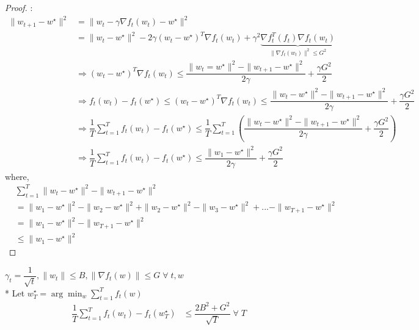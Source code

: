 \documentclass{article}
\begin{document}
\begin{proof} \label{proof:t1} 
:
\begin{align*}
\| w_{t+1} - w^\star  \|^{2} &= \| w_{t} - \gamma \nabla  f_{t}\left(w_{t}\right) - w^\star  \|^{2}
\\ &= \| w_{t} - w^\star  \|^{2} - 2 \gamma \left(w_{t} - w^\star \right)^{T} \nabla  f_{t}\left(w_{t}\right) + \gamma^{2} \underbrace{ \nabla  f_{t}^{T}\left(f_{t}\right) \nabla  f_{t}\left(w_{t}\right) }_{\| \nabla  f_{t}\left(w_{t}\right) \|^{2} \leq  G^{2}}
\\ &\Rightarrow  \left(w_{t} - w^\star \right)^{T} \nabla  f_{t}\left(w_{t}\right) \leq  \dfrac{\| w_{t} = w^\star  \|^{2} - \|w_{t+1} - w^\star  \|^{2}}{2 \gamma} + \dfrac{\gamma G^{2}}{2}
\\ &\Rightarrow  f_{t}\left(w_{t}\right) - f_{t}\left(w^\star \right) \leq  \left(w_{t} - w^\star \right)^{T} \nabla  f_{t}\left(w_{t}\right) \leq  \dfrac{\| w_{t} - w^\star  \|^{2} - \|w_{t+1} - w^\star  \|^{2}}{2 \gamma} + \dfrac{\gamma G^{2}}{2}
\\ &\Rightarrow  \dfrac{1}{T} \displaystyle\sum_{t=1}^{T} f_{t}\left(w_{t}\right) - f_{t}\left(w^\star \right) \leq  \dfrac{1}{T} \displaystyle\sum_{t=1}^{T} \left(\dfrac{\| w_{t} - w^\star  \|^{2} - \|w_{t+1} - w^\star  \|^{2}}{2 \gamma} + \dfrac{\gamma G^{2}}{2}\right)
\\ &\Rightarrow  \dfrac{1}{T} \displaystyle\sum_{t=1}^{T} f_{t}\left(w_{t}\right) - f_{t}\left(w^\star \right) \leq  \dfrac{\| w_{1} - w^\star  \|^{2}}{2 \gamma} + \dfrac{\gamma G^{2}}{2}
\end{align*}
where,
\begin{align*}
&  \displaystyle\sum_{t=1}^{T} \| w_{t} - w^\star  \|^{2} - \|w_{t+1} - w^\star  \|^{2}
\\ &= \| w_{1} - w^\star  \|^{2} - \| w_{2} - w^\star  \|^{2} + \| w_{2} - w^\star  \|^{2} - \| w_{3} - w^\star  \|^{2} + ... - \| w_{T+1} - w^\star  \|^{2}
\\ &= \| w_{1} - w^\star  \|^{2} - \| w_{T+1} - w^\star  \|^{2}
\\ &\leq  \| w_{1} - w^\star  \|^{2}
\end{align*}\end{proof}
\begin{thm} \label{thm:t2} 
$\gamma_{t} = \dfrac{1}{\sqrt{t}}, \| w_{t} \| \leq  B , \| \nabla  f_{t}\left(w\right) \| \leq  G \;\forall\; t, w $
\\* Let $w^\star _{T} = \arg\displaystyle\min_{w} \displaystyle\sum_{t=1}^{T} f_{t}\left(w\right)$
\begin{align*}
\dfrac{1}{T} \displaystyle\sum_{t=1}^{T} f_{t}\left(w_{t}\right) - f_{t}\left(w^\star _{T}\right) &\leq  \dfrac{2 B^{2} + G^{2}}{\sqrt{T}} \;\forall\; T 
\end{align*}\end{thm}
\end{document}
